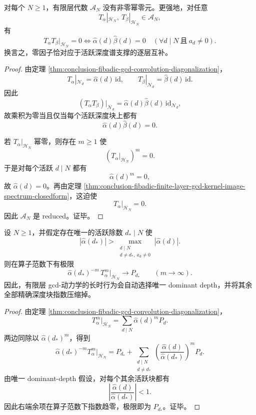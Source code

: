\begin{corollary}\label{cor:conclusion-fibadic-finite-layer-gcd-reduced-zero-divisor-complement}
对每个 \(N\ge 1\)，有限层代数 \(\mathcal A_N\) 没有非零幂零元。更强地，对任意
\[
T_\alpha|_{\mathcal H_N},\ T_\beta|_{\mathcal H_N}\in \mathcal A_N,
\]
有
\[
T_\alpha T_\beta|_{\mathcal H_N}=0
\iff
\widehat\alpha(d)\widehat\beta(d)=0
\quad
(\forall d\mid N\ \text{且}\ a_d\neq 0).
\]
换言之，零因子恰对应于活跃深度谱支撑的逐层互补。
\end{corollary}
\begin{proof}
由定理 \ref{thm:conclusion-fibadic-gcd-convolution-diagonalization}，
\[
T_\alpha|_{\mathcal N_d}=\widehat\alpha(d)\,\mathrm{id},
\qquad
T_\beta|_{\mathcal N_d}=\widehat\beta(d)\,\mathrm{id}.
\]
因此
\[
(T_\alpha T_\beta)|_{\mathcal N_d}
=
\widehat\alpha(d)\widehat\beta(d)\,\mathrm{id}_{\mathcal N_d},
\]
故乘积为零当且仅当每个活跃深度块上都有
\[
\widehat\alpha(d)\widehat\beta(d)=0.
\]

若 \(T_\alpha|_{\mathcal H_N}\) 幂零，则存在 \(m\ge 1\) 使
\[
(T_\alpha|_{\mathcal H_N})^m=0.
\]
于是对每个活跃 \(d\mid N\) 都有
\[
\widehat\alpha(d)^m=0,
\]
故 \(\widehat\alpha(d)=0\)。再由定理 \ref{thm:conclusion-fibadic-finite-layer-gcd-kernel-image-spectrum-closedform}，这迫使
\[
T_\alpha|_{\mathcal H_N}=0.
\]
因此 \(\mathcal A_N\) 是 reduced。证毕。
\end{proof}

\begin{theorem}\label{thm:conclusion-fibadic-finite-layer-dominant-depth-selection}
设 \(N\ge 1\)，并假定存在唯一的活跃除数 \(d_\ast\mid N\) 使
\[
|\widehat\alpha(d_\ast)|
>
\max_{\substack{d\mid N\\ d\neq d_\ast,\ a_d\neq 0}}
|\widehat\alpha(d)|.
\]
则在算子范数下有极限
\[
\widehat\alpha(d_\ast)^{-m}\,T_\alpha^m|_{\mathcal H_N}
\longrightarrow
P_{d_\ast}
\qquad
(m\to\infty).
\]
因此，有限层 gcd-动力学的长时行为会自动选择唯一 dominant depth，并将其余全部精确深度块指数压缩掉。
\end{theorem}
\begin{proof}
由定理 \ref{thm:conclusion-fibadic-gcd-convolution-diagonalization}，
\[
T_\alpha^m|_{\mathcal H_N}
=
\sum_{d\mid N}\widehat\alpha(d)^mP_d.
\]
两边同除以 \(\widehat\alpha(d_\ast)^m\)，得到
\[
\widehat\alpha(d_\ast)^{-m}T_\alpha^m|_{\mathcal H_N}
=
P_{d_\ast}
+
\sum_{\substack{d\mid N\\ d\neq d_\ast}}
\left(\frac{\widehat\alpha(d)}{\widehat\alpha(d_\ast)}\right)^m P_d.
\]
由唯一 dominant-depth 假设，对每个其余活跃块都有
\[
\left|\frac{\widehat\alpha(d)}{\widehat\alpha(d_\ast)}\right|<1.
\]
因此右端余项在算子范数下指数趋零，极限即为 \(P_{d_\ast}\)。证毕。
\end{proof}

